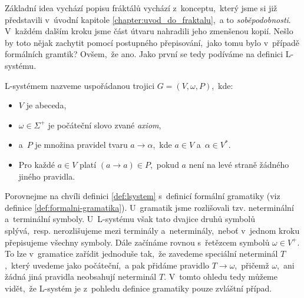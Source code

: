 Základní idea vychází popisu fráktálů vychází z~konceptu,~který jsme si již představili v~úvodní kapitole \ref{chapter:uvod_do_fraktalu},~a to \emph{soběpodobnosti}. V~každém dalším kroku jsme část útvaru nahradili jeho zmenšenou kopií. Nešlo by toto nějak zachytit pomocí postupného přepisování,~jako tomu bylo v~případě formálních gramtik? Ovšem,~že ano. Jako první se tedy podíváme na definici L-systému.
\begin{definition}[L-systém]\label{def:lsystem}
    L-systémem nazveme uspořádanou trojici $G=(V,\omega,P)$,~kde:
    \begin{itemize}
        \item $V$ je abeceda,
        \item $\omega\in\Sigma^+$ je počáteční slovo zvané \emph{axiom},
        \item a~$P$ je množina pravidel tvaru $a\to\alpha$,~kde $a\in V$ a~$\alpha\in V^*$.
        \item Pro každé $a\in V$ platí $(a\to a)\in P$,~pokud $a$ není na levé straně žádného jiného pravidla.
    \end{itemize}
\end{definition}
Porovnejme na chvíli definici \ref{def:lsystem} s~definicí formální gramatiky (viz definice \ref{def:formalni-gramatika}). U~gramatik jsme rozlišovali tzv. neterminální a~terminální symboly. U~L-systému však tato dvajice druhů symbolů splývá,~resp. nerozlišujeme mezi terminály a~neterminály,~neboť v~jednom kroku přepisujeme všechny symboly. Dále začínáme rovnou s~řetězcem symbolů $\omega\in V^+$. To lze v~gramatice zařídit jednoduše tak,~že zavedeme speciální neterminál $T$,~který uvedeme jako počáteční,~a pak přidáme pravidlo $T\to\omega$,~přičemž $\omega$,~ani žádná jiná pravidla neobsahují neterminál $T$. V~tomto ohledu tedy můžeme vidět,~že L-systém je z~pohledu definice gramatiky pouze zvláštní případ.

